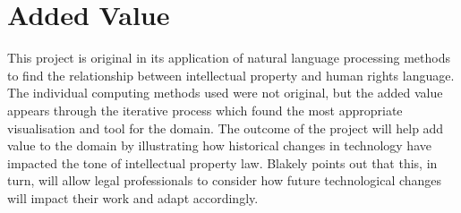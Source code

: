 		\section{Added Value}
			This project is original in its application of natural language processing methods to find the relationship between intellectual property and human rights language. The individual computing methods used were not original, but the added value appears through the iterative process which found the most appropriate visualisation and tool for the domain. The outcome of the project will help add value to the domain by illustrating how historical changes in technology have impacted the tone of intellectual property law. Blakely points out that this, in turn, will allow legal professionals to consider how future technological changes will impact their work and adapt accordingly.			